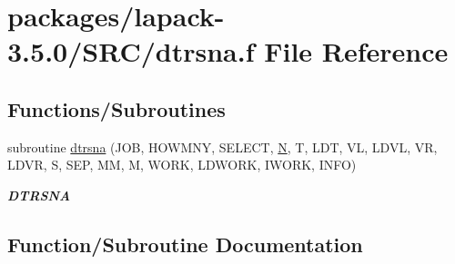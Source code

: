 \hypertarget{dtrsna_8f}{}\section{packages/lapack-\/3.5.0/\+S\+R\+C/dtrsna.f File Reference}
\label{dtrsna_8f}
\subsection*{Functions/\+Subroutines}
\begin{DoxyCompactItemize}
\item 
subroutine \hyperlink{dtrsna_8f_ab43d2d84b0705732572c187aa4558077}{dtrsna} (J\+O\+B, H\+O\+W\+M\+N\+Y, S\+E\+L\+E\+C\+T, \hyperlink{polmisc_8c_a0240ac851181b84ac374872dc5434ee4}{N}, T, L\+D\+T, V\+L, L\+D\+V\+L, V\+R, L\+D\+V\+R, S, S\+E\+P, M\+M, M, W\+O\+R\+K, L\+D\+W\+O\+R\+K, I\+W\+O\+R\+K, I\+N\+F\+O)
\begin{DoxyCompactList}\small\item\em {\bfseries D\+T\+R\+S\+N\+A} \end{DoxyCompactList}\end{DoxyCompactItemize}


\subsection{Function/\+Subroutine Documentation}
\hypertarget{dtrsna_8f_ab43d2d84b0705732572c187aa4558077}{}
